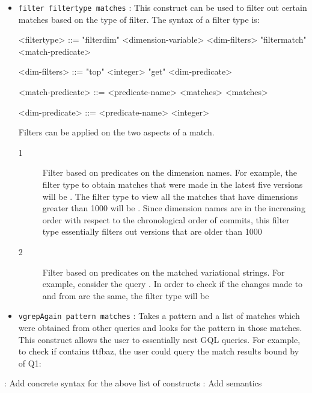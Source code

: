 \begin{itemize}
\begin{description}
        
        To compare between the changes made to  and , the user can first check if both the queries have any results at all. 
        
 \end{description}
\item \texttt{filter filtertype matches} : This construct can be used to filter out certain matches based on the type of filter.
 The syntax of a filter type is:
 \begin{grammar} 

<filtertype> ::= "filterdim" <dimension-variable> <dim-filters>  
            \alt "filtermatch" <match-predicate> 

<dim-filters> ::= "top" <integer>
                 \alt "get" <dim-predicate>

<match-predicate> ::= <predicate-name> <matches> <matches>

<dim-predicate> ::= <predicate-name> <integer>
\end{grammar}

Filters can be applied on the two aspects of a match.
 \begin{description}
  \item[1] Filter based on predicates on the dimension names. For example, the filter type to obtain matches that were made in the latest five versions will be . The filter type to view all the matches that have dimensions greater than 1000 will be . Since dimension names are in the increasing order with respect to the chronological order of commits, this filter type essentially filters out versions that are older than 1000
  \item[2] Filter based on predicates on the matched variational strings. For example, consider the query . In order to check if the changes made to  and  from  are the same, the filter type will be 
 \end{description}
\item \texttt{vgrepAgain pattern matches} : Takes a pattern and a list of matches which were obtained from other queries and looks for the pattern in those matches. This construct allows the user to essentially nest GQL queries. For example, to check if  contains ttf{baz}, the user could query the match results bound by  of Q1:
\end{itemize}
{\mytodo : Add concrete syntax for the above list of constructs}
{\mytodo : Add semantics}